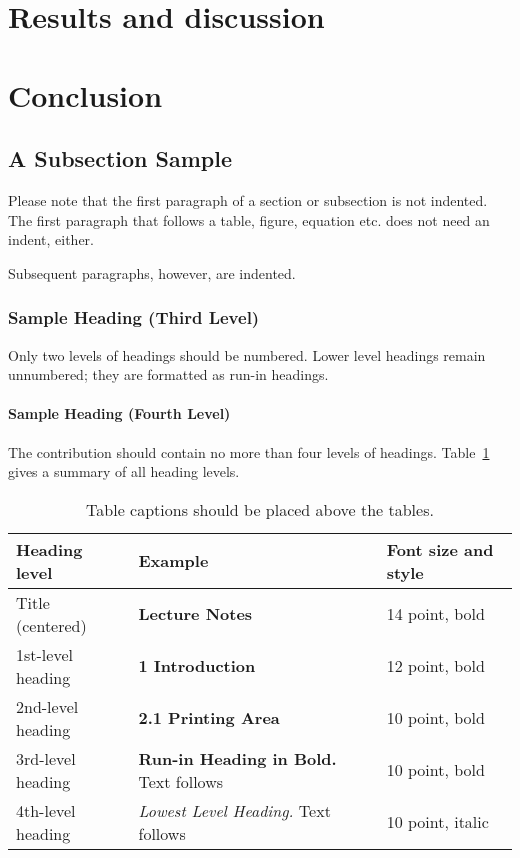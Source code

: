 \documentclass[runningheads]{llncs}
\begin{document}
\section{Results and discussion}
\section{Conclusion}
\subsection{A Subsection Sample}
Please note that the first paragraph of a section or subsection is
not indented. The first paragraph that follows a table, figure,
equation etc. does not need an indent, either.

Subsequent paragraphs, however, are indented.

\subsubsection{Sample Heading (Third Level)} Only two levels of
headings should be numbered. Lower level headings remain unnumbered;
they are formatted as run-in headings.

\paragraph{Sample Heading (Fourth Level)}
The contribution should contain no more than four levels of
headings. Table~\ref{tab1} gives a summary of all heading levels.

\begin{table}
\caption{Table captions should be placed above the
tables.}\label{tab1}
\begin{tabular}{|l|l|l|}
\hline
Heading level &  Example & Font size and style\\
\hline
Title (centered) &  {\Large\bfseries Lecture Notes} & 14 point, bold\\
1st-level heading &  {\large\bfseries 1 Introduction} & 12 point, bold\\
2nd-level heading & {\bfseries 2.1 Printing Area} & 10 point, bold\\
3rd-level heading & {\bfseries Run-in Heading in Bold.} Text follows & 10 point, bold\\
4th-level heading & {\itshape Lowest Level Heading.} Text follows & 10 point, italic\\
\hline
\end{tabular}
\end{table}
\end{document}
